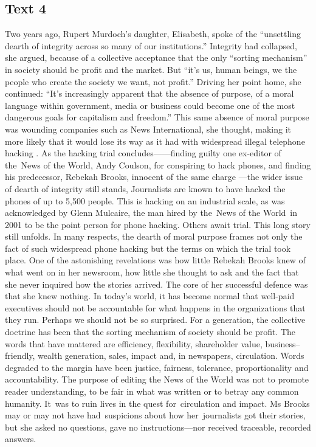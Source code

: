 \subsection{Text 4}
   Two years ago, Rupert Murdoch’s daughter, Elisabeth, spoke of the “unsettling dearth of integrity across so many of our institutions.” Integrity had collapsed, she argued, because of a collective acceptance that the only “sorting mechanism” in society should be profit and the market. But “it’s us, human beings, we the people who create the society we want, not profit.”
   Driving her point home, she continued: “It’s increasingly apparent that the absence of purpose, of a moral language within government, media or business could become one of the most dangerous goals for capitalism and freedom.” This same absence of moral purpose was wounding companies such as News International, she thought, making it more likely that it would lose its way as it had with widespread illegal telephone hacking .
   As the hacking trial concludes——finding guilty one ex-editor of the News of the World, Andy Coulson, for conspiring to hack phones, and finding his predecessor, Rebekah Brooks, innocent of the same charge —the wider issue of dearth of integrity still stands, Journalists are known to have hacked the phones of up to 5,500 people. This is hacking on an industrial scale, as was acknowledged by Glenn Mulcaire, the man hired by the News of the World in 2001 to be the point person for phone hacking. Others await trial. This long story still unfolds.
   In many respects, the dearth of moral purpose frames not only the fact of such widespread phone hacking but the terms on which the trial took place. One of the astonishing revelations was how little Rebekah Brooks knew of what went on in her newsroom, how little she thought to ask and the fact that she never inquired how the stories arrived. The core of her successful defence was that she knew nothing.
   In today’s world, it has become normal that well-paid executives should not be accountable for what happens in the organizations that they run. Perhaps we should not be so surprised. For a generation, the collective doctrine has been that the sorting mechanism of society should be profit. The words that have mattered are efficiency, flexibility, shareholder value, business–friendly, wealth generation, sales, impact and, in newspapers, circulation. Words degraded to the margin have been justice, fairness, tolerance, proportionality and accountability.
   The purpose of editing the News of the World was not to promote reader understanding, to be fair in what was written or to betray any common humanity. It was to ruin lives in the quest for circulation and impact. Ms Brooks may or may not have had suspicions about how her journalists got their stories, but she asked no questions, gave no instructions—nor received traceable, recorded answers.
